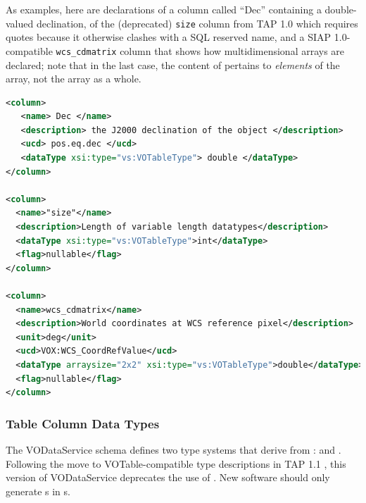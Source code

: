 \documentclass[11pt,a4paper]{ivoa}
\begin{document}
As examples, here are declarations of a column called ``Dec'' containing
a double-valued declination, of the (deprecated) \verb|size| column
from TAP 1.0 which requires quotes because it otherwise clashes with a
SQL reserved name, and a SIAP 1.0-compatible \verb|wcs_cdmatrix|
column that shows how multidimensional arrays are declared; note that in
the last case, the content of  pertains to \emph{elements}
of the array, not the array as a whole.

\begin{lstlisting}[language=XML,basicstyle=\footnotesize]
<column>
   <name> Dec </name>
   <description> the J2000 declination of the object </description>
   <ucd> pos.eq.dec </ucd>
   <dataType xsi:type="vs:VOTableType"> double </dataType>
</column>

<column>
  <name>"size"</name>
  <description>Length of variable length datatypes</description>
  <dataType xsi:type="vs:VOTableType">int</dataType>
  <flag>nullable</flag>
</column>

<column>
  <name>wcs_cdmatrix</name>
  <description>World coordinates at WCS reference pixel</description>
  <unit>deg</unit>
  <ucd>VOX:WCS_CoordRefValue</ucd>
  <dataType arraysize="2x2" xsi:type="vs:VOTableType">double</dataType>
  <flag>nullable</flag>
</column>
\end{lstlisting}


\subsubsection{Table Column Data Types}
\label{sect:tbldatatypes}


The VODataService schema defines two type systems that derive from
:   and
.  Following the move to VOTable-compatible type
descriptions in TAP 1.1 \citep{2019ivoa.spec.0927D}, this version of
VODataService deprecates the use of .  New software
should only generate s in s.
\end{document}
